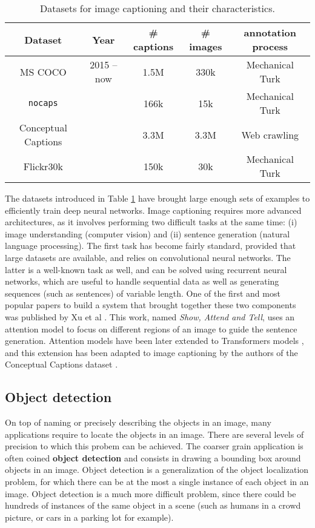 \begin{table}
	\centering
	\caption{Datasets for image captioning and their characteristics.}
	\begin{tabular}{|c|c|c|c|c|}
		\hline
		Dataset & Year & \# captions & \# images & annotation process \\
		\hline
		MS COCO \cite{chen2015microsoft} & 2015 -- now & 1.5M & 330k & Mechanical Turk \\
		\texttt{nocaps} \cite{agrawal2019nocaps} & &  166k & 15k & Mechanical Turk \\
		Conceptual Captions \cite{sharma-etal-2018-conceptual} & & 3.3M & 3.3M & Web crawling \\
		Flickr30k \cite{flickr30k} & & 150k & 30k & Mechanical Turk \\
		\hline
	\end{tabular}
	\label{tab:caption_ds}
\end{table}
\vspace{0.5cm}

The datasets introduced in Table \ref{tab:caption_ds} have brought large enough sets of examples to efficiently train deep neural networks. Image captioning requires more advanced architectures, as it involves performing two difficult tasks at the same time: (i) image understanding (computer vision) and (ii) sentence generation (natural language processing). The first task has become fairly standard, provided that large datasets are available, and relies on convolutional neural networks. The latter is a well-known task as well, and can be solved using recurrent neural networks, which are useful to handle sequential data as well as generating sequences (such as sentences) of variable length. One of the first and most popular papers to build a system that brought together these two components was published by Xu et al \cite{xu2015show}. This work, named \textit{Show, Attend and Tell}, uses an attention model to focus on different regions of an image to guide the sentence generation. Attention models have been later extended to Transformers models \cite{vaswani2017attention}, and this extension has been adapted to image captioning by the authors of the Conceptual Captions dataset \cite{sharma-etal-2018-conceptual}.

\subsection{Object detection}

On top of naming or precisely describing the objects in an image, many applications require to locate the objects in an image. There are several levels of precision to which this probem can be achieved. The coarser grain application is often coined \textbf{object detection} and consists in drawing a bounding box around objects in an image. Object detection is a generalization of the object localization problem, for which there can be at the most a single instance of each object in an image. Object detection is a much more difficult problem, since there could be hundreds of instances of the same object in a scene (such as humans in a crowd picture, or cars in a parking lot for example).

